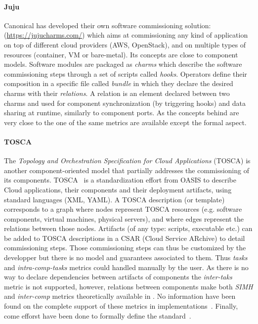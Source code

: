 \paragraph{Juju}
Canonical has developed their own software commissioning solution:
\juju (\url{https://jujucharms.com/}) which aims at commissioning any
kind of application on top of different cloud providers (\eg AWS,
OpenStack), and on multiple types of resources (container, VM or
bare-metal). Its concepts are close to component models. Software
modules are packaged as \juju \emph{charms} which describe the
software commissioning steps through a set of scripts called
\emph{hooks}. Operators define their composition in a specific file
called \emph{bundle} in which they declare the desired charms with
their \emph{relations}. A relation is an element declared between two
charms and used for component synchronization (by triggering hooks)
and data sharing at runtime, similarly to component ports. As the
concepts behind \juju are very close to the one of \aeolus the same
metrics are available except the formal aspect.

\paragraph{TOSCA}
The \emph{Topology and Orchestration Specification for Cloud
  Applications} (TOSCA) is another component-oriented model that
partially addresses the commissioning of its
components. TOSCA~\cite{tosca:web,10.1007/978-3-319-74781-1_33} is a
standardization effort from OASIS to describe Cloud applications,
their components and their deployment artifacts, using standard
languages (\ie XML, YAML). A TOSCA description (or template)
corresponds to a graph where nodes represent TOSCA resources
(e.g. software components, virtual machines, physical servers), and
where edges represent the relations between those nodes. Artifacts (of
any type: scripts, executable etc.) can be added to TOSCA descriptions
in a CSAR (Cloud Service ARchive) to detail commissioning steps. Those
commissioning steps can thus be customized by the developper but there
is no model and guarantees associated to them. Thus \emph{tasks} and
\emph{intra-comp-tasks} metrics could handled manually by the user. As
there is no way to declare dependencies between artifacts of
components the \emph{inter-taks} metric is not supported, however,
relations between components make both \emph{SIMH} and
\emph{inter-comp} metrics theoretically available in \tosca. No
information have been found on the complete support of these metrics
in \tosca implementations~\cite{cloudify:web,opentosca:web}. Finally,
come efforst have been done to formally define the \tosca
standard~\cite{tosca:web}.

